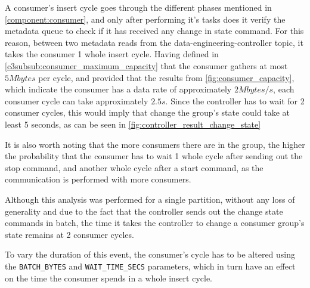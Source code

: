 A consumer's insert cycle goes through the different phases mentioned in \ref{component:consumer}, and only after performing it's tasks does it verify the metadata queue to check if it has received any change in state command. For this reason, between two metadata reads from the data-engineering-controller topic, it takes the consumer 1 whole insert cycle. Having defined in \ref{c3subsub:consumer_maximum_capacity} that the consumer gathers at most $5Mbytes$ per cycle, and provided that the results from \ref{fig:consumer_capacity}, which indicate the consumer has a data rate of approximately $2Mbytes/s$, each consumer cycle can take approximately $2.5s$. Since the controller has to wait for 2 consumer cycles, this would imply that change the group's state could take at least 5 seconds, as can be seen in \ref{fig:controller_result_change_state}

It is also worth noting that the more consumers there are in the group, the higher the probability that the consumer has to wait 1 whole cycle after sending out the stop command, and another whole cycle after a start command, as the communication is performed with more consumers.

Although this analysis was performed for a single partition, without any loss of generality and due to the fact that the controller sends out the change state commands in batch, the time it takes the controller to change a consumer group's state remains at 2 consumer cycles.

To vary the duration of this event, the consumer's cycle has to be altered using the \lstinline[language=Python]{BATCH_BYTES} and \lstinline[language=Python]{WAIT_TIME_SECS} parameters, which in turn have an effect on the time the consumer spends in a whole insert cycle.
